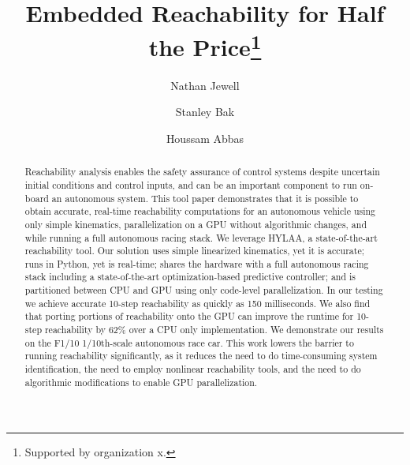 \documentclass[runningheads]{llncs}
\begin{document}
%
\title{Embedded Reachability for Half the Price\thanks{Supported by organization x.}}
%
%
\author{Nathan Jewell \and
Stanley Bak \and
Houssam Abbas} 
%
%
%
\maketitle              %
%
\begin{abstract}
Reachability analysis enables the safety assurance of control systems despite uncertain initial conditions and control inputs, and can be an important component to run on-board an autonomous system.
This tool paper demonstrates that it is possible to obtain accurate, real-time reachability computations for an autonomous vehicle using only simple kinematics, parallelization on a GPU without algorithmic changes, and while running a full autonomous racing stack.
We leverage HYLAA, a state-of-the-art reachability tool.
Our solution uses simple linearized kinematics, yet it is accurate; runs in Python, yet is real-time; shares the hardware with a full autonomous racing stack including a state-of-the-art optimization-based predictive controller; and is partitioned between CPU and GPU using only code-level parallelization.
In our testing we achieve accurate 10-step reachability as quickly as 150 milliseconds. 
We also find that porting portions of reachability onto the GPU can improve the runtime for 10-step reachability by 62\% over a CPU only implementation.%
We demonstrate our results on the F1/10 1/10th-scale autonomous race car.
This work lowers the barrier to running reachability significantly, as it reduces the need to do time-consuming system identification, the need to employ nonlinear reachability tools, and the need to do algorithmic modifications to enable GPU parallelization.

\end{abstract}
%
%
%
\end{document}
